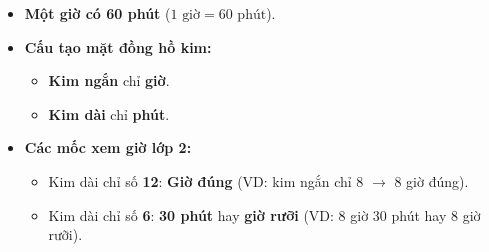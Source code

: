 \documentclass[11pt,a4paper]{article}
\begin{document}
\begin{minipage}[t]{0.49\textwidth}\vspace{0pt}
\begin{tcolorbox}[
  enhanced,
  colback=teal!4!white,
  colframe=teal!75!black,
  arc=2mm, boxrule=0.8pt,
  left=2mm, right=2mm, top=1.8mm, bottom=1.8mm,
  title={\footnotesize\bfseries\color{white}\faSliders\ 2. Giờ và Phút}
]
{\footnotesize
\begin{itemize}\setlength{\itemsep}{1pt}\setlength{\leftskip}{-2.5mm}
  \item \textbf{Một giờ có 60 phút} ($1\text{ giờ} = 60\text{ phút}$).
  \item \textbf{Cấu tạo mặt đồng hồ kim:}
  \begin{itemize}\setlength{\itemsep}{0.5pt}\setlength{\leftskip}{-2.5mm}
    \item \textbf{Kim ngắn} chỉ \textbf{giờ}.
    \item \textbf{Kim dài} chỉ \textbf{phút}.
  \end{itemize}
  \item \textbf{Các mốc xem giờ lớp 2:}
  \begin{itemize}\setlength{\itemsep}{0.5pt}\setlength{\leftskip}{-2.5mm}
    \item Kim dài chỉ số \textbf{12}: \textbf{Giờ đúng} (VD: kim ngắn chỉ 8 $\to$ $8$ giờ đúng).
    \item Kim dài chỉ số \textbf{6}: \textbf{30 phút} hay \textbf{giờ rưỡi} (VD: $8$ giờ $30$ phút hay $8$ giờ rưỡi).
  \end{itemize}
\end{itemize}
}
\end{tcolorbox}
\end{minipage}
\end{document}
